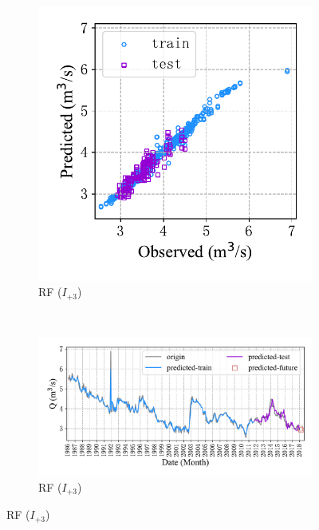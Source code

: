 \begin{figure}[!htbp]
\begin{subfigure}[b]{0.615\textwidth}
  \end{subfigure}
  \\
  \centering
  \begin{subfigure}[b]{0.305\textwidth}
    \includegraphics[width=\textwidth]{Img/chap4_spr/out2/spr_scatter_in_3_out_2_rf.pdf}
    \vspace{-1.2cm}
    \caption{RF ($I_{+3}$)}
    \label{fig:spr_scatter_in_3_out_2_rf}
  \end{subfigure}
  ~
  \begin{subfigure}[b]{0.615\textwidth}
    \includegraphics[width=\textwidth]{Img/chap4_spr/out2/spr_series_in_3_out_2_rf.pdf}
    \vspace{-1.2cm}
    \caption{RF ($I_{+3}$)}
    \label{fig:spr_series_in_3_out_2_rf}

\end{subfigure}
\end{figure}
